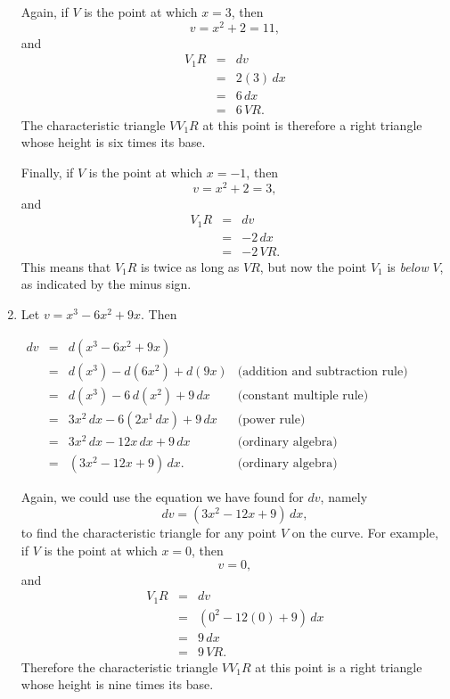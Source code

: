 \documentclass[twoside,openright]{article}
\begin{document}
\begin{enumerate}
Again, if $V$ is the point at which $x=3$, then 
$$v= x^2 + 2 = 11,$$
and 
\begin{eqnarray*}
V_1R & = & dv\\
&= & 2(3)\,dx\\
& = & 6\,dx\\
& = & 6\,VR.
\end{eqnarray*}
The characteristic triangle $VV_1R$ at this point is therefore a right
triangle whose height is six times its base.

Finally, if $V$ is the point at which $x= -1$, then 
$$v = x^2 + 2 = 3,$$
and 
\begin{eqnarray*}
V_1R & = & dv\\
& = & -2\,dx\\
& = & -2\,VR.
\end{eqnarray*}
This means that $V_1R$ is twice as long as $VR$, but now the point
$V_1$ is {\em below} $V$, as indicated by the minus sign.

\item \label{ex2} Let $v =x^3 - 6x^2 +9x.$
Then
\begin{center}

$\begin{array}{ccll}
dv & = & d(x^3 - 6x^2 + 9x) & \\
& = & d(x^3) - d(6x^2) + d(9x) & \mbox{(addition and subtraction rule)} \\
& = & d(x^3) - 6\,d(x^2) + 9\,dx & \mbox{(constant multiple rule)} \\
& = & 3x^2\,dx - 6(2x^1\,dx) + 9\,dx & \mbox{(power rule)} \\
& = & 3x^2\,dx - 12x\,dx + 9\,dx & \mbox{(ordinary algebra)}\\
& = & (3x^2 -12x + 9)\,dx. & \mbox{(ordinary algebra)}
\end{array}$
\end{center}

Again, we could use the equation we have found for $dv$, namely
$$dv = (3x^2 -12x +9)\,dx,$$
to find the characteristic triangle for any point $V$ on the curve.
For example, if $V$ is the point at which $x= 0$, then
$$v = 0,$$
and 
\begin{eqnarray*}
V_1R & = & dv\\
& = & (0^2 - 12(0) +9)\,dx\\
& = & 9\,dx\\
& = & 9\,VR.
\end{eqnarray*}
Therefore the characteristic triangle $VV_1R$ at this point is a right
triangle whose height is nine times its base.


\end{enumerate}
\end{document}
